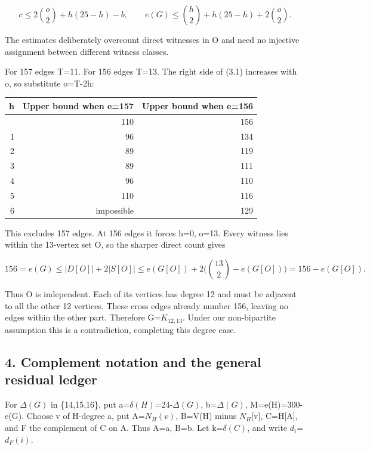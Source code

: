 \documentclass[
  11pt,
]{article}
\begin{document}
\[
c\le 2\binom{o}{2}+h(25-h)-b,
\qquad
e(G)\le \binom h2+h(25-h)+2\binom o2. \tag{3.1}
\]

The estimates deliberately overcount direct witnesses in O and need no
injective assignment between different witness classes.

For 157 edges T=11. For 156 edges T=13. The right side of (3.1)
increases with o, so substitute o=T-2h:

\begin{longtable}[]{@{}rrr@{}}
\toprule\noalign{}
h & Upper bound when e=157 & Upper bound when e=156 \\
\midrule\noalign{}
\endhead
\bottomrule\noalign{}
\endlastfoot
0 & 110 & 156 \\
1 & 96 & 134 \\
2 & 89 & 119 \\
3 & 89 & 111 \\
4 & 96 & 110 \\
5 & 110 & 116 \\
6 & impossible & 129 \\
\end{longtable}

This excludes 157 edges. At 156 edges it forces h=0, o=13. Every witness
lies within the 13-vertex set O, so the sharper direct count gives

\[
156=e(G)\le |D[O]|+2|S[O]|
\le e(G[O])+2\bigl(\binom{13}{2}-e(G[O])\bigr)
=156-e(G[O]).
\]

Thus O is independent. Each of its vertices has degree 12 and must be
adjacent to all the other 12 vertices. These cross edges already number
156, leaving no edges within the other part. Therefore
G=\ensuremath{K_{12,13}}. Under our non-bipartite assumption this is a
contradiction, completing this degree case.

\hypertarget{complement-notation-and-the-general-residual-ledger}{%
\subsection{4. Complement notation and the general residual
ledger}\label{complement-notation-and-the-general-residual-ledger}}

For \ensuremath{\Delta (G)} in \{14,15,16\}, put
a=\ensuremath{\delta (H)}=24-\ensuremath{\Delta (G)},
b=\ensuremath{\Delta (G)}, M=e(H)=300-e(G). Choose v of H-degree a, put
A=\ensuremath{N_H(v)}, B=V(H) minus \ensuremath{N_H}{[}v{]}, C=H{[}A{]},
and F the complement of C on A. Thus \textbar A\textbar=a,
\textbar B\textbar=b. Let k=\ensuremath{\delta (C)}, and write
\ensuremath{d_i}=\ensuremath{d_F(i)}.
\end{document}
